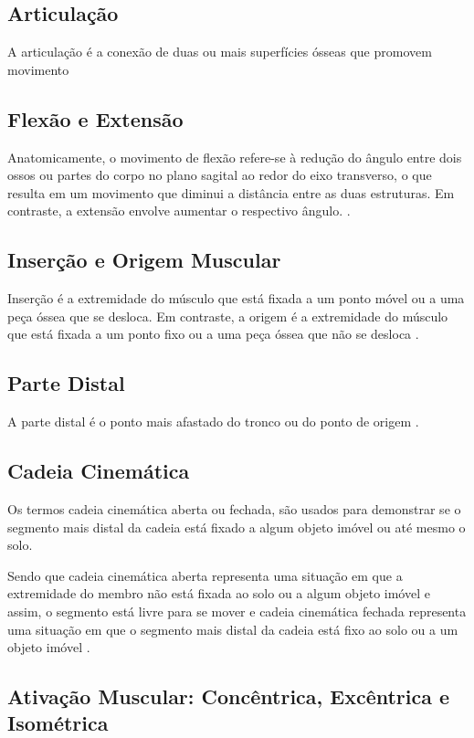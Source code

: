 \subsection[Articulação]{Articulação}
A articulação é a conexão de duas ou mais superfícies ósseas que promovem movimento \cite{articulacao}


\subsection[Flexão e Extensão]{Flexão e Extensão}
Anatomicamente, o movimento de flexão refere-se à redução do ângulo entre dois ossos ou partes do corpo no plano sagital ao redor do eixo transverso, o que resulta em um movimento que diminui a distância entre as duas estruturas. Em contraste, a extensão envolve aumentar o respectivo ângulo. \cite{flexao}.


\subsection[Inserção e Origem Muscular]{Inserção e Origem Muscular}
Inserção é a extremidade do músculo que está fixada a um ponto móvel ou a uma peça óssea que se desloca. Em contraste, a origem é a extremidade do músculo que está fixada a um ponto fixo ou a uma peça óssea que não se desloca \cite{sisMuscular}.


\subsection[Parte Distal]{Parte Distal}
A parte distal é o ponto mais afastado do tronco ou do ponto de origem \cite{distal}.



\subsection[Cadeia Cinemática]{Cadeia Cinemática}
Os termos cadeia cinemática aberta ou fechada, são usados para demonstrar se o segmento mais distal da cadeia está fixado a algum objeto imóvel ou até mesmo o solo.

Sendo que cadeia cinemática aberta representa uma situação em que a extremidade do membro não está fixada ao solo ou a algum objeto imóvel e assim, o segmento está livre para se mover e cadeia cinemática fechada representa uma situação em que o segmento mais distal da cadeia está fixo ao solo ou a um objeto imóvel \cite{silva2015cinesiologia}.


\subsection[Ativação Muscular]{Ativação Muscular: Concêntrica, Excêntrica e Isométrica}

